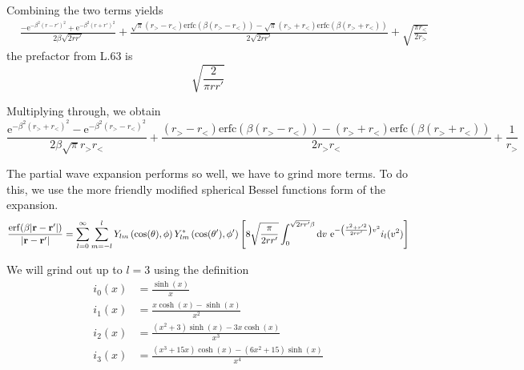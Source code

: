 \documentclass[paper=a4, fontsize=11pt]{article} %
\numberwithin{equation}{section} %
\numberwithin{figure}{section} %
\numberwithin{table}{section} %
\newcommand{\br}{{\bf{r}}}
\newcommand{\re}{{\mathrm{e}}}
\newcommand{\rerf}{{\mathrm{erf}}}
\newcommand{\rerfc}{{\mathrm{erfc}}}
\newcommand{\rd}{{\mathrm{d}}}
\begin{document}
Combining the two terms yields
\begin{equation}
\begin{split}
&\frac{-\re^{-\beta^2(r-r')^2 } + \re^{-\beta^2(r+r')^2 }}{2\beta \sqrt{2 r r'}} + \frac{\sqrt{\pi}(r_> - r_<)\rerfc\left(\beta(r_> - r_<)\right) - \sqrt{\pi}(r_> + r_<)\rerfc\left(\beta(r_> + r_<)\right)}{2\sqrt{2rr'}} + \sqrt{\frac{ \pi r_<}{2r_>}}
\end{split}
\end{equation}
the prefactor from L.63 is
\begin{equation}
\sqrt{\frac{2}{\pi r r'}} 
\end{equation}

Multiplying through, we obtain
\begin{equation}
\frac{\re^{-\beta^2(r_>+r_<)^2 }-\re^{-\beta^2(r_>-r_<)^2 }}{2\beta \sqrt{\pi}r_> r_< } + \frac{(r_> - r_<)\rerfc\left(\beta(r_> - r_<)\right) - (r_> + r_<)\rerfc\left(\beta(r_> + r_<)\right)}{2 r_>r_<} + \frac{1}{r_>}
\end{equation}
\clearpage

The partial wave expansion performs so well, we have to grind more terms. To do this, we use the more friendly modified spherical Bessel functions form of the expansion.
\begin{equation}
\begin{split}
\frac{\rerf(\beta|\br-\br'|)}{|\br-\br'|}
&= \sum_{l=0}^\infty \sum_{m=-l}^{l} Y_{lm}\left(\cos(\theta),\phi\right)Y_{lm}^*\left(\cos(\theta'),\phi'\right) \left[ 8\sqrt{\frac{\pi}{2rr'}} \int_0^{\sqrt{2rr'}\beta} \rd v\ \re^{-\left(\frac{r^2 + r'^2}{2rr'}\right)v^2}i_{l}(v^2)\right] \\
\end{split}
\end{equation}

We will grind out up to $l=3$ using the definition
\begin{equation}
\begin{split}
i_0(x)    &=    \frac{\sinh(x)}{x}    \\
i_1(x)    &=    \frac{x\cosh(x)-\sinh(x)}{x^2}   \\ 
i_2(x)    &=    \frac{(x^2+3)\sinh(x)-3x\cosh(x)}{x^3}    \\
i_3(x)    &=    \frac{(x^3+15x)\cosh(x)-(6x^2+15)\sinh(x)}{x^4}
\end{split}
\end{equation}
\end{document}
